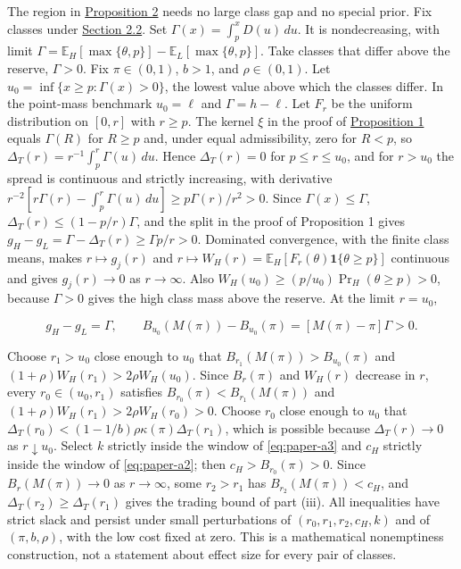 The region in \hyperref[result-proposition-2]{Proposition 2} needs no
large class gap and no special prior. Fix classes under
\hyperref[sec-values-preparation-and-the-sale]{Section 2.2}. Set
\(\Gamma(x)=\int_p^xD(u)\,du\). It is nondecreasing, with limit
\(\Gamma=\mathbb E_H[\max\{\theta,p\}]-\mathbb E_L[\max\{\theta,p\}]\).
Take classes that differ above the reserve, \(\Gamma>0\). Fix
\(\pi\in(0,1)\), \(b>1\), and \(\rho\in(0,1)\). Let
\(u_0=\inf\{x\ge p:\Gamma(x)>0\}\), the lowest value above which the
classes differ. In the point-mass benchmark \(u_0=\ell\) and
\(\Gamma=h-\ell\). Let \(F_r\) be the uniform distribution on \([0,r]\)
with \(r\ge p\). The kernel \(\xi\) in the proof of
\hyperref[result-proposition-1]{Proposition 1} equals \(\Gamma(R)\) for
\(R\ge p\) and, under equal admissibility, zero for \(R<p\), so
\(\Delta_T(r)=r^{-1}\int_p^r\Gamma(u)\,du\). Hence \(\Delta_T(r)=0\) for
\(p\le r\le u_0\), and for \(r>u_0\) the spread is continuous and
strictly increasing, with derivative
\(r^{-2}[r\Gamma(r)-\int_p^r\Gamma(u)\,du]\ge p\Gamma(r)/r^2>0\). Since
\(\Gamma(x)\le\Gamma\), \(\Delta_T(r)\le(1-p/r)\Gamma\), and the split
in the proof of Proposition 1 gives
\(g_H-g_L=\Gamma-\Delta_T(r)\ge\Gamma p/r>0\). Dominated convergence,
with the finite class means, makes \(r\mapsto g_j(r)\) and
\(r\mapsto W_H(r)=\mathbb E_H[F_r(\theta)\mathbf1\{\theta\ge p\}]\)
continuous and gives \(g_j(r)\to0\) as \(r\to\infty\). Also
\(W_H(u_0)\ge(p/u_0)\Pr_H(\theta\ge p)>0\), because \(\Gamma>0\) gives
the high class mass above the reserve. At the limit \(r=u_0\),

\[
g_H-g_L=\Gamma,\qquad
B_{u_0}(M(\pi))-B_{u_0}(\pi)=[M(\pi)-\pi]\Gamma>0.
\tag{A.25}\label{eq:paper-a-25}
\]

Choose \(r_1>u_0\) close enough to \(u_0\) that
\(B_{r_1}(M(\pi))>B_{u_0}(\pi)\) and
\((1+\rho)W_H(r_1)>2\rho W_H(u_0)\). Since \(B_r(\pi)\) and \(W_H(r)\)
decrease in \(r\), every \(r_0\in(u_0,r_1)\) satisfies
\(B_{r_0}(\pi)<B_{r_1}(M(\pi))\) and
\((1+\rho)W_H(r_1)>2\rho W_H(r_0)>0\). Choose \(r_0\) close enough to
\(u_0\) that \(\Delta_T(r_0)<(1-1/b)\rho\kappa(\pi)\Delta_T(r_1)\),
which is possible because \(\Delta_T(r)\to0\) as \(r\downarrow u_0\).
Select \(k\) strictly inside the window of \eqref{eq:paper-a3} and
\(c_H\) strictly inside the window of \eqref{eq:paper-a2}; then
\(c_H>B_{r_0}(\pi)>0\). Since \(B_r(M(\pi))\to0\) as \(r\to\infty\),
some \(r_2>r_1\) has \(B_{r_2}(M(\pi))<c_H\), and
\(\Delta_T(r_2)\ge\Delta_T(r_1)\) gives the trading bound of part
(iii). All inequalities have strict slack and persist under small
perturbations of \((r_0,r_1,r_2,c_H,k)\) and of \((\pi,b,\rho)\), with
the low cost fixed at zero. This is a mathematical nonemptiness
construction, not a statement about effect size for every pair of
classes.

